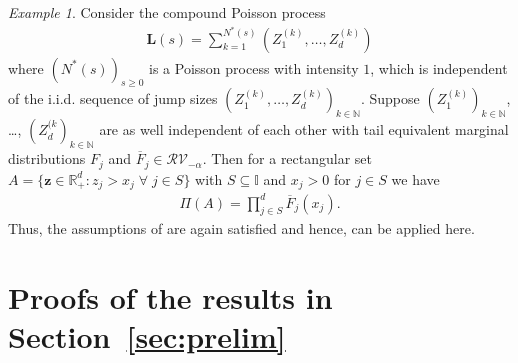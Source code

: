 \documentclass[aos]{imsart}
\numberwithin{equation}{section}
\theoremstyle{plain} %
\theoremstyle{remark}
\newtheorem{example}[theorem]{Example}
\newcommand{\beao}{\begin{eqnarray*}}
\newcommand{\eeao}{\end{eqnarray*}\noindent}
\newcommand{\N}{\mathbb{N}}
\newcommand{\R}{\mathbb{R}}
\newcommand{\VF}[1]{{\color{blue} #1}}
\def\bL{\boldsymbol L}
\def\bz{\boldsymbol z}
\newcommand{\ov}{\overline}
\newcommand{\DAS}[1]{{\color{red} #1}}
\begin{document}
\begin{example}
Consider the compound Poisson process
\beao
    \bL(s)=\sum_{k=1}^{N^*(s)}(Z_1^{(k)},\ldots,Z_d^{(k)})
\eeao
where $(N^*(s))_{s\geq 0}$ is a Poisson process with intensity $1$, which is independent of the i.i.d. sequence of jump sizes $(Z_1^{(k)},\ldots,Z_d^{(k)})_{k\in\N}$. Suppose 
$(Z_1^{(k)})_{k\in\N}$, \ldots, $(Z_d^{(k})_{k\in\N}$
are as well independent of each other with tail equivalent marginal distributions $F_{j}$ and $\ov F_j\in\mathcal{RV}_{-\alpha}$. Then 
for a rectangular set $A= \{\bz \in \R_+^d: z_j>x_j \;\forall\; j\in S\}$  with
 $S\subseteq \mathbb{I}$ and  $x_{j}>0$ for $j\in S$ we have
\beao
    \Pi(A)=\prod_{j\in S}^d\ov F_j(x_j).
\eeao
Thus, the assumptions  of  are again satisfied {and hence, can be applied here}.
\end{example}










\appendix

\section{Proofs of the results in Section~\ref{sec:prelim}} \label{sec:proofprelim}
\end{document}
